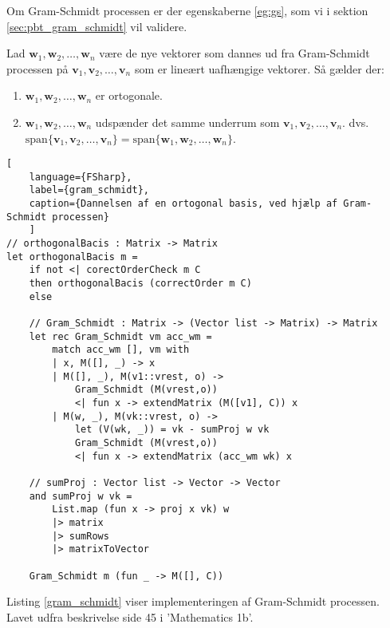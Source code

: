 Om Gram-Schmidt processen er der egenskaberne \ref{eg:gs}, som vi i sektion \ref{sec:pbt_gram_schmidt} vil validere.
\vspace{0.5cm}
\begin{egenskab}\label{eg:gs}
    Lad $\mathbf{w}_1, \mathbf{w}_2, \ldots, \mathbf{w}_n$ være de nye vektorer som dannes ud fra Gram-Schmidt processen på $\mathbf{v}_1, \mathbf{v}_2, \ldots, \mathbf{v}_n$ som er lineært uafhængige vektorer. Så gælder der:
    \begin{enumerate}
        \item $\mathbf{w}_1, \mathbf{w}_2, \ldots, \mathbf{w}_n$ er ortogonale.
        \item $\mathbf{w}_1, \mathbf{w}_2, \ldots, \mathbf{w}_n$ udspænder det samme underrum som $\mathbf{v}_1, \mathbf{v}_2, \ldots, \mathbf{v}_n$. dvs. \\$\text{span}\{\mathbf{v}_1, \mathbf{v}_2, \ldots, \mathbf{v}_n\} = \text{span}\{\mathbf{w}_1, \mathbf{w}_2, \ldots, \mathbf{w}_n\}$.
    \end{enumerate}
\end{egenskab}


\begin{lstlisting}[
    language={FSharp}, 
    label={gram_schmidt}, 
    caption={Dannelsen af en ortogonal basis, ved hjælp af Gram-Schmidt processen}
    ]
// orthogonalBacis : Matrix -> Matrix
let orthogonalBacis m =
    if not <| corectOrderCheck m C  
    then orthogonalBacis (correctOrder m C)
    else

    // Gram_Schmidt : Matrix -> (Vector list -> Matrix) -> Matrix
    let rec Gram_Schmidt vm acc_wm =
        match acc_wm [], vm with
        | x, M([], _) -> x 
        | M([], _), M(v1::vrest, o) -> 
            Gram_Schmidt (M(vrest,o)) 
            <| fun x -> extendMatrix (M([v1], C)) x 
        | M(w, _), M(vk::vrest, o) -> 
            let (V(wk, _)) = vk - sumProj w vk
            Gram_Schmidt (M(vrest,o)) 
            <| fun x -> extendMatrix (acc_wm wk) x

    // sumProj : Vector list -> Vector -> Vector
    and sumProj w vk =
        List.map (fun x -> proj x vk) w 
        |> matrix 
        |> sumRows
        |> matrixToVector
        
    Gram_Schmidt m (fun _ -> M([], C))
\end{lstlisting}

Listing \ref{gram_schmidt} viser implementeringen af Gram-Schmidt processen. Lavet udfra beskrivelse side 45 i 'Mathematics 1b'.

